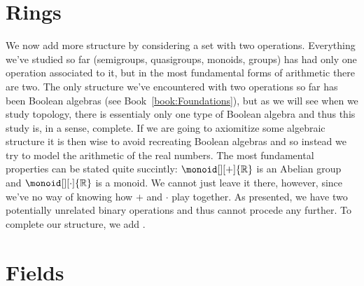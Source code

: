 \begingroup
    \ifcsname\PATH\endcsname
        \newcommand{\PATH}{books/Algebra/Ring_Theory}
        \newcommand{\OLDPATH}{\PATH}
    \else
        \newcommand{\OLDPATH}{\PATH}
        \renewcommand{\PATH}{books/Algebra/Ring_Theory}
    \fi
    \chapter{Rings}
        We now add more structure by considering a set with two operations.
        Everything we've studied so far (semigroups, quasigroups, monoids,
        groups) has had only one operation associated to it, but in the most
        fundamental forms of arithmetic there are two. The only structure we've
        encountered with two operations so far has been Boolean algebras
        (see Book~\ref{book:Foundations}), but as we will see when we study
        topology, there is essentialy only one type of Boolean algebra and thus
        this study is, in a sense, complete. If we are going to axiomitize some
        algebraic structure it is then wise to avoid recreating Boolean algebras
        and so instead we try to model the arithmetic of the real numbers. The
        most fundamental properties can be stated quite succintly:
        $\monoid[][+]{\mathbb{R}}$ is an Abelian group and
        $\monoid[][\cdot]{\mathbb{R}}$ is a monoid. We cannot just leave it
        there, however, since we've no way of knowing how $+$ and $\cdot$ play
        together. As presented, we have two potentially unrelated binary
        operations and thus cannot procede any further. To complete our
        structure, we add .
        
        
    \chapter{Fields}
        
    \renewcommand{\PATH}{\OLDPATH}
\endgroup